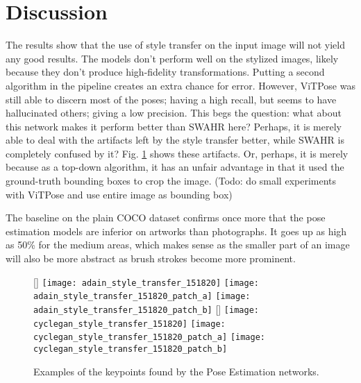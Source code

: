 \section{Discussion}
\label{sec:baseline_human_art_discussion}
The results show that the use of style transfer on the input image will not yield any good results.
The models don't perform well on the stylized images, likely because they don't produce high-fidelity transformations.
Putting a second algorithm in the pipeline creates an extra chance for error.
However, ViTPose was still able to discern most of the poses; having a high recall, but seems to have hallucinated others; giving a low precision.
This begs the question: what about this network makes it perform better than SWAHR here?
Perhaps, it is merely able to deal with the artifacts left by the style transfer better, while SWAHR is completely confused by it?
Fig. \ref{fig:baseline_style_transfer_artifacts} shows these artifacts.
Or, perhaps, it is merely because as a top-down algorithm, it has an unfair advantage in that it used the ground-truth bounding boxes to crop the image.
(Todo: do small experiments with ViTPose and use entire image as bounding box)

The baseline on the plain COCO dataset confirms once more that the pose estimation models are inferior on artworks than photographs.
It goes up as high as 50\% for the medium areas, which makes sense as the smaller part of an image will also be more abstract as brush strokes become more prominent.


\begin{figure}
    \centering
	[\textwidth]{%
		\texttt{[image: adain\_style\_transfer\_151820]}%
		\texttt{[image: adain\_style\_transfer\_151820\_patch\_a]}%
		\texttt{[image: adain\_style\_transfer\_151820\_patch\_b]}%
    }
    [\textwidth]{%
		\texttt{[image: cyclegan\_style\_transfer\_151820]}%
		\texttt{[image: cyclegan\_style\_transfer\_151820\_patch\_a]}%
		\texttt{[image: cyclegan\_style\_transfer\_151820\_patch\_b]}%
	}
	\label{fig:baseline_style_transfer_artifacts}
	\caption{
		Examples of the keypoints found by the Pose Estimation networks.
	}
\end{figure}